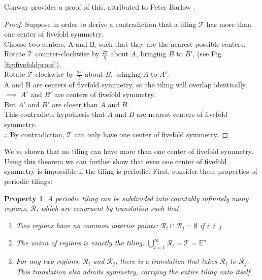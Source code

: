 \documentclass[
  oneside,
  11pt, a4paper,
  footinclude=true,
  headinclude=true,
  cleardoublepage=empty
]{scrbook}
\newtheorem{myprop}{Property}
\begin{document}
Conway provides a proof of this, attributed to Peter Barlow \cite{Gardner1997}.

\begin{proof}
Suppose in order to derive a contradiction that a tiling $\mathcal{T}$ has more than one center of fivefold symmetry.\\
Choose two centers, A and B, such that they are the nearest possible centers. \\
Rotate $\mathcal{T}$ counter-clockwise by $\frac{2\pi}{5}$ about $A$, bringing $B$ to $B'$, (see Fig.\ref{fig:fivefoldproof}).\\
Rotate $\mathcal{T}$ clockwise by $\frac{2\pi}{5}$ about $B$, bringing $A$ to $A'$.\\
A and B are centers of fivefold symmetry, so the tiling will overlap identically.\\
$\implies$ $A'$ and $B'$ are centers of fivefold symmetry.\\
But $A'$ and $B'$ are closer than $A$ and $B$.\\
This contradicts hypothesis that $A$ and $B$ are nearest centers of fivefold symmetry.\\
$\therefore$ By contradiction, $\mathcal{T}$ can only have one center of fivefold symmetry.
\end{proof}

We've shown that no tiling can have more than one center of fivefold symmetry. Using this theorem we can further show that even one center of fivefold symmetry is impossible if the tiling is periodic. First, consider these properties of periodic tilings:

\begin{myprop}
A periodic tiling can be subdivided into countably infinitely many regions, $\mathcal{R}$, which are congruent by translation such that
\begin{enumerate}
\item Two regions have no common interior points: $\mathring{\mathcal{R}_i} \cap  \mathring{\mathcal{R}_j}=\emptyset$ if $i\neq j$
\item The union of regions is exactly the tiling: $\bigcup_{i=1}^\infty \mathcal{R}_i = \mathcal{T}=\mathbb{E}^n$
\item For any two regions, $\mathcal{R}_i$ and $\mathcal{R}_j$, there is a translation that takes  $\mathcal{R}_i$ to $\mathcal{R}_j$. This translation also admits symmetry, carrying the entire tiling onto itself. \label{periodprop3}
\end{enumerate}
\label{periodprop}
\end{myprop}
\end{document}
